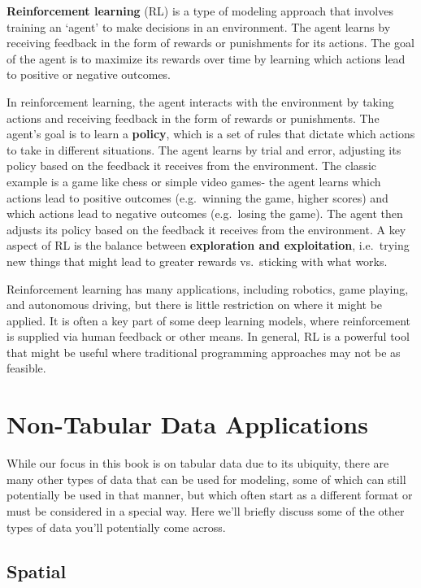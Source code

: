 \documentclass[
  letterpaper,
]{krantz}
\begin{document}
\textbf{Reinforcement learning} (RL) is a type of modeling approach that
involves training an `agent' to make decisions in an environment. The
agent learns by receiving feedback in the form of rewards or punishments
for its actions. The goal of the agent is to maximize its rewards over
time by learning which actions lead to positive or negative outcomes.

In reinforcement learning, the agent interacts with the environment by
taking actions and receiving feedback in the form of rewards or
punishments. The agent's goal is to learn a \textbf{policy}, which is a
set of rules that dictate which actions to take in different situations.
The agent learns by trial and error, adjusting its policy based on the
feedback it receives from the environment. The classic example is a game
like chess or simple video games- the agent learns which actions lead to
positive outcomes (e.g.~winning the game, higher scores) and which
actions lead to negative outcomes (e.g.~losing the game). The agent then
adjusts its policy based on the feedback it receives from the
environment. A key aspect of RL is the balance between
\textbf{exploration and exploitation}, i.e.~trying new things that might
lead to greater rewards vs.~sticking with what works.

Reinforcement learning has many applications, including robotics, game
playing, and autonomous driving, but there is little restriction on
where it might be applied. It is often a key part of some deep learning
models, where reinforcement is supplied via human feedback or other
means. In general, RL is a powerful tool that might be useful where
traditional programming approaches may not be as feasible.

\section{Non-Tabular Data
Applications}\label{non-tabular-data-applications}

While our focus in this book is on tabular data due to its ubiquity,
there are many other types of data that can be used for modeling, some
of which can still potentially be used in that manner, but which often
start as a different format or must be considered in a special way. Here
we'll briefly discuss some of the other types of data you'll potentially
come across.

\subsection{Spatial}\label{spatial}
\end{document}
